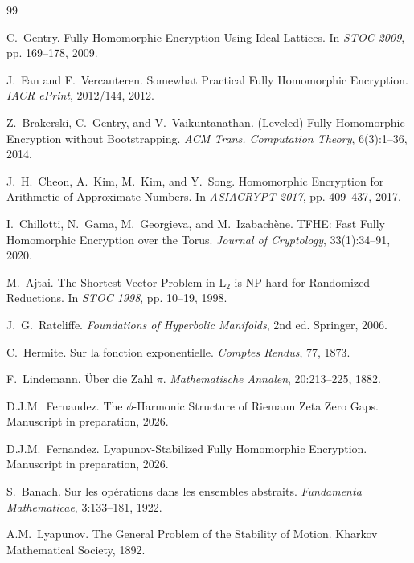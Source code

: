 \documentclass[11pt,a4paper]{article}
\theoremstyle{remark}
\begin{document}

\begin{thebibliography}{99}

C.~Gentry.
\newblock Fully Homomorphic Encryption Using Ideal Lattices.
\newblock In \textit{STOC 2009}, pp. 169--178, 2009.

J.~Fan and F.~Vercauteren.
\newblock Somewhat Practical Fully Homomorphic Encryption.
\newblock \textit{IACR ePrint}, 2012/144, 2012.

Z.~Brakerski, C.~Gentry, and V.~Vaikuntanathan.
\newblock (Leveled) Fully Homomorphic Encryption without Bootstrapping.
\newblock \textit{ACM Trans. Computation Theory}, 6(3):1--36, 2014.

J.~H.~Cheon, A.~Kim, M.~Kim, and Y.~Song.
\newblock Homomorphic Encryption for Arithmetic of Approximate Numbers.
\newblock In \textit{ASIACRYPT 2017}, pp. 409--437, 2017.

I.~Chillotti, N.~Gama, M.~Georgieva, and M.~Izabach\`{e}ne.
\newblock TFHE: Fast Fully Homomorphic Encryption over the Torus.
\newblock \textit{Journal of Cryptology}, 33(1):34--91, 2020.

M.~Ajtai.
\newblock The Shortest Vector Problem in L$_2$ is NP-hard for Randomized Reductions.
\newblock In \textit{STOC 1998}, pp. 10--19, 1998.

J.~G.~Ratcliffe.
\newblock \textit{Foundations of Hyperbolic Manifolds}, 2nd ed.
\newblock Springer, 2006.

C.~Hermite.
\newblock Sur la fonction exponentielle.
\newblock \textit{Comptes Rendus}, 77, 1873.

F.~Lindemann.
\newblock \"{U}ber die Zahl $\pi$.
\newblock \textit{Mathematische Annalen}, 20:213--225, 1882.

D.J.M.~Fernandez.
\newblock The $\phi$-Harmonic Structure of Riemann Zeta Zero Gaps.
\newblock Manuscript in preparation, 2026.

D.J.M.~Fernandez.
\newblock Lyapunov-Stabilized Fully Homomorphic Encryption.
\newblock Manuscript in preparation, 2026.

S.~Banach.
\newblock Sur les op\'{e}rations dans les ensembles abstraits.
\newblock \textit{Fundamenta Mathematicae}, 3:133--181, 1922.

A.M.~Lyapunov.
\newblock The General Problem of the Stability of Motion.
\newblock Kharkov Mathematical Society, 1892.

\end{thebibliography}
\end{document}

